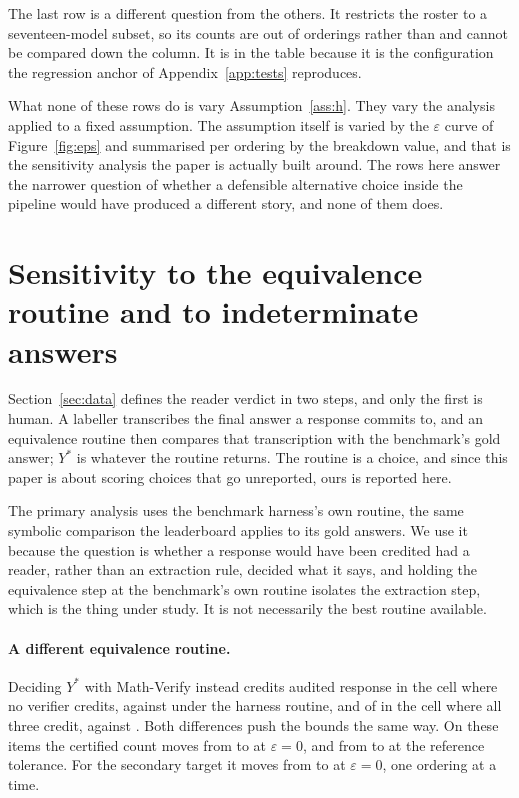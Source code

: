 The last row is a different question from the others. It restricts the roster to a
seventeen-model subset, so its counts are out of \NumOrderingsSeventeen{} orderings rather than
\NumOrderings{} and cannot be compared down the column. It is in the table because it is the
configuration the regression anchor of Appendix~\ref{app:tests} reproduces.

What none of these rows do is vary Assumption~\ref{ass:h}. They vary the analysis applied to
a fixed assumption. The assumption itself is varied by the $\varepsilon$ curve of
Figure~\ref{fig:eps} and summarised per ordering by the breakdown value, and that is the
sensitivity analysis the paper is actually built around. The rows here answer the narrower
question of whether a defensible alternative choice inside the pipeline would have produced a
different story, and none of them does.

\section{Sensitivity to the equivalence routine and to indeterminate answers}
\label{sec:sensitivity}

Section~\ref{sec:data} defines the reader verdict in two steps, and only the first is human. A
labeller transcribes the final answer a response commits to, and an equivalence routine then
compares that transcription with the benchmark's gold answer; $Y^*$ is whatever the routine
returns. The routine is a choice, and since this paper is about scoring choices that go
unreported, ours is reported here.

The primary analysis uses the benchmark harness's own routine, the same symbolic comparison the
leaderboard applies to its gold answers. We use it because the question is whether a response
would have been credited had a reader, rather than an extraction rule, decided what it says, and
holding the equivalence step at the benchmark's own routine isolates the extraction step, which
is the thing under study. It is not necessarily the best routine available.

\paragraph{A different equivalence routine.}
Deciding $Y^*$ with Math-Verify instead credits \SensMvCorrectRejectAll{} audited response in
the cell where no verifier credits, against \AuditCorrectRejectAll{} under the harness routine,
and \SensMvCorrectAgreeAll{} of \AuditNAgreeAll{} in the cell where all three credit, against
\AuditCorrectAgreeAll{}. Both differences push the bounds the same way. On these items the
certified count moves from \CertFixedEpsZero{} to \SensMvFixedEpsZero{} at $\varepsilon = 0$,
and from \CertFixedPrereg{} to \SensMvFixed{} at the reference tolerance. For the secondary
target it moves from \CertEpsZero{} to \SensMvCombined{} at
$\varepsilon = 0$, one ordering at a time.

